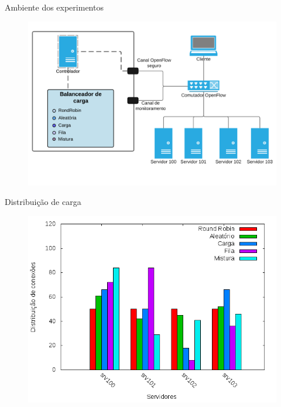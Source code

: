 \begin{frame}{Ambiente dos experimentos}

    \begin{figure}[htb!]
        \centering
        \includegraphics[scale=.7]{images/balancer-testbed-img}
    \end{figure}

\end{frame}


\begin{frame}{Distribuição de carga}

    \begin{figure}[htb!]
        \centering
        \includegraphics[scale=0.5]{images/balancer-distribution.png}
    \end{figure}

\end{frame}


